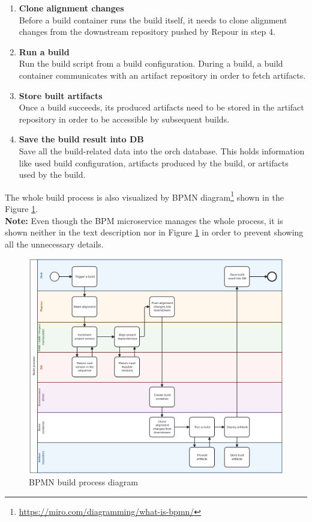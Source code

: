 \documentclass[../main.tex]{subfiles}
\begin{document}
\begin{enumerate}
    \item \textbf{Clone alignment changes}\\
    Before a build container runs the build itself, it needs to clone alignment changes from the downstream repository pushed by Repour in step 4.

    \item \textbf{Run a build}\\
    Run the build script from a build configuration. During a build, a build container communicates with an artifact repository in order to fetch artifacts.

    \item \textbf{Store built artifacts}\\
    Once a build succeeds, its produced artifacts need to be stored in the artifact repository in order to be accessible by subsequent builds.

    \item \textbf{Save the build result into DB}\\
    Save all the build-related data into the orch database. This holds information like used build configuration, artifacts produced by the build, or artifacts used by the build.
    
\end{enumerate}

The whole build process is also visualized by BPMN diagram\footnote{\url{https://miro.com/diagramming/what-is-bpmn/}} shown in the Figure \ref{fig:build-process-bpmn}.\\
\textbf{Note:} Even though the BPM microservice manages the whole process, it is shown neither in the text description nor in Figure \ref{fig:build-process-bpmn} in order to prevent showing all the unnecessary details.

\begin{figure}
  \begin{center}
    \includegraphics[width=\textwidth]{images/build-process-bpmn.png}
  \end{center}
  \caption{BPMN build process diagram}
  \label{fig:build-process-bpmn}
\end{figure}
\end{document}
